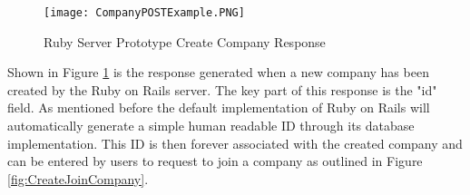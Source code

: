 \begin{figure}[ht]
  \centering
      \texttt{[image: CompanyPOSTExample.PNG]}
  \caption[Ruby Server Prototype Create Company Response]{Ruby Server Prototype Create Company Response}
  \label{fig:CompanyPOST}
\end{figure}

Shown in Figure \ref{fig:CompanyPOST} is the response generated when a new company has been created by the Ruby on Rails server. The key part of this response is the "id" field. As mentioned before the default implementation of Ruby on Rails will automatically generate a simple human readable ID through its database implementation. This ID is then forever associated with the created company and can be entered by users to request to join a company as outlined in Figure \ref{fig:CreateJoinCompany}.